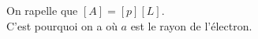 \documentclass[a4paper]{article}
\begin{document}
\pagestyle{fancy}
\fancyhf{}
\setlength{\headheight}{15pt}

\begin{center}
	\large{}
\end{center}


On rapelle que \( [A] = [p][L] \).\\[2pt]
C'est pourquoi on a  où \( a \) est le rayon de l'électron.
\end{document}
